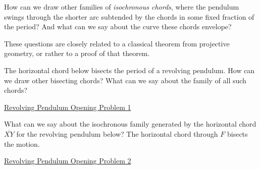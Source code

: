\documentclass{ximera}
\begin{document}

How can we draw other families of \emph{isochronous chords}, where the pendulum swings through the shorter arc subtended by the chords in some fixed fraction of the period?  And what can we say about the curve these chords envelope?


These questions are closely related to a classical theorem from projective geometry, or rather to a proof of that theorem.


\begin{exploration}
The horizontal chord below bisects the period of a revolving pendulum. How can we draw other bisecting chords? What can we say about the family of all such chords?

\begin{onlineOnly}
    \begin{center}
\end{center}
\end{onlineOnly}

\href{https://www.desmos.com/calculator/x5fzsfvxdb}{Revolving Pendulum Opening Problem 1}

\end{exploration}

\begin{exploration}
What can we say about the isochronous family generated by the horizontal chord $\overline{XY}$ for the revolving pendulum below? The horizontal chord through $F$ bisects the motion.

\begin{onlineOnly}
    \begin{center}
\end{center}
\end{onlineOnly}

\href{https://www.desmos.com/calculator/1kyfdn6yyc}{Revolving Pendulum Opening Problem 2}

\end{exploration}




\end{document}
